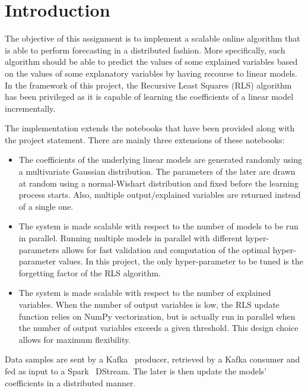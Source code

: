 \chapter{Introduction}

The objective of this assignment is to implement a scalable online algorithm
that is able to perform forecasting in a distributed fashion.
More specifically, such algorithm should be able to predict the values of
some explained variables based on the values of some explanatory variables
by having recourse to linear models. In the framework of this project,
the Recursive Least Squares (RLS) algorithm has been privileged as it is
capable of learning the coefficients of a linear model incrementally.

The implementation extends the notebooks that have been provided
along with the project statement. There are mainly three extensions of these
notebooks:
\begin{itemize}
    \item The coefficients of the underlying linear models are generated randomly
        using a multivariate Gaussian distribution. The parameters of the later
        are drawn at random using a normal-Wishart distribution and fixed
        before the learning process starts.
        Also, multiple output/explained variables are returned instead of a single
        one.
    \item The system is made scalable with respect to the number of models to be
        run in parallel. Running multiple models in parallel with different
        hyper-parameters allows for fast validation and computation of the
        optimal hyper-parameter values. In this project, the only hyper-parameter
        to be tuned is the forgetting factor of the RLS algorithm.
    \item The system is made scalable with respect to the number of explained
        variables. When the number of output variables is low, the RLS update
        function relies on NumPy vectorization, but is actually run in parallel
        when the number of output variables exceeds a given threshold.
        This design choice allows for maximum flexibility.
\end{itemize}

Data samples are sent by a Kafka~\cite{kreps2011kafka} producer, retrieved by a Kafka
consumer and fed as input to a Spark~\cite{zaharia2010spark} DStream.
The later is then update the models' coefficients
in a distributed manner. 
